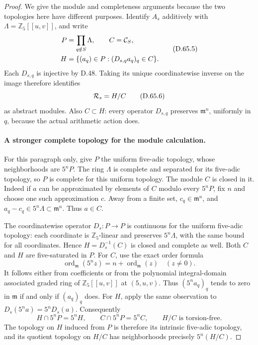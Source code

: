 \begin{proof}
We give the module and completeness arguments because
the two topologies here have different purposes.
Identify \(A_s\) additively with
\(\Lambda=\mathbb Z_5[[u,v]]\), and write
\[
 \begin{split}
 P&=\prod_{q\notin S}\Lambda,\qquad C={\cal C}_S,\\
 H&=\{(a_q)\in P:(D_{s,q}a_q)_q\in C\}.
 \end{split}                                             \tag{D.65.5}
\]
Each \(D_{s,q}\) is injective by D.48. Taking its unique
coordinatewise inverse on the image therefore identifies
\[
                             {\cal R}_s=H/C             \tag{D.65.6}
\]
as abstract modules. Also \(C\subset H\): every operator
\(D_{s,q}\) preserves \(\mathfrak m^n\), uniformly in
\(q\), because the actual arithmetic action does.

\paragraph{A stronger complete topology for the module calculation.}
For this paragraph only, give \(P\) the uniform
five-adic topology, whose neighborhoods are \(5^nP\).
The ring \(\Lambda\) is complete and separated for its
five-adic topology, so \(P\) is complete for this
uniform topology. The module \(C\) is closed in it.
Indeed if \(a\) can be approximated by elements of
\(C\) modulo every \(5^nP\), fix \(n\) and choose one
such approximation \(c\). Away from a finite set,
\(c_q\in\mathfrak m^n\), and
\(a_q-c_q\in5^n\Lambda\subset\mathfrak m^n\).
Thus \(a\in C\).

The coordinatewise operator \(D_s:P\to P\) is
continuous for the uniform five-adic topology:
each coordinate is \(\mathbb Z_5\)-linear and preserves
\(5^n\Lambda\), with the same bound for all coordinates.
Hence \(H=D_s^{-1}(C)\) is closed and complete as well.
Both \(C\) and \(H\) are five-saturated in \(P\).
For \(C\), use the exact order formula
\[
 \operatorname{ord}_{\mathfrak m}(5^n z)
          =n+\operatorname{ord}_{\mathfrak m}(z)
                        \quad(z\ne0).                  \tag{D.65.7}
\]
It follows either from coefficients or from the
polynomial integral-domain associated graded ring
of \(\mathbb Z_5[[u,v]]\) at \((5,u,v)\).
Thus \((5^na_q)_q\) tends to zero in \(\mathfrak m\)
if and only if \((a_q)_q\) does. For \(H\), apply the
same observation to \(D_s(5^na)=5^nD_s(a)\).
Consequently
\[
 H\cap5^nP=5^nH,\qquad C\cap5^nP=5^nC,
                  \qquad H/C\text{ is torsion-free}.
                                                        \tag{D.65.8}
\]
The topology on \(H\) induced from \(P\) is therefore
its intrinsic five-adic topology, and its quotient
topology on \(H/C\) has neighborhoods precisely
\(5^n(H/C)\).


\end{proof}
